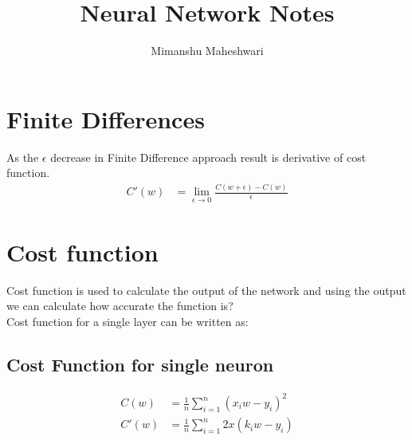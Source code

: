 \documentclass{article}
\begin{document}
\title{Neural Network Notes}
\author{Mimanshu Maheshwari}


\section{Finite Differences}
As the $\epsilon$ decrease in Finite Difference approach result is derivative of cost function.
\begin{align}
	C'(w) &= \lim_{\epsilon \to 0}\frac{C(w + \epsilon) - C(w)}{\epsilon}
\end{align}

\section{Cost function}
Cost function is used to calculate the output of the network and using the output we can calculate how accurate the function is? \\
Cost function for a single layer can be written as:
\subsection{Cost Function for single neuron}
\begin{align}
	C(w) &= \frac{1}{n}\sum_{i=1}^{n}{\left(x_iw - y_i\right)^2} \\
	C'(w) &= \frac{1}{n}\sum_{i=1}^{n}{2x\left(k_iw - y_i\right)}
\end{align}
\end{document}

